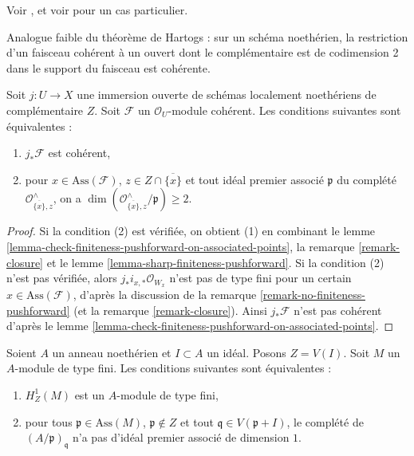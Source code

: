 \begin{proposition}[Koll\'ar]
\label{proposition-kollar}
\begin{reference}
Voir \cite{k-coherent}, et voir \cite[IV, Proposition 7.2.2]{EGA} pour un cas particulier.
\end{reference}
\begin{slogan}
Analogue faible du théorème de Hartogs : sur un schéma noethérien, la restriction d'un faisceau cohérent à un ouvert dont le complémentaire est de codimension 2 dans le support du faisceau est cohérente.
\end{slogan}
Soit $j : U \to X$ une immersion ouverte de schémas localement noethériens de complémentaire $Z$. Soit $\mathcal{F}$ un $\mathcal{O}_U$-module cohérent. Les conditions suivantes sont équivalentes :
\begin{enumerate}
\item $j_*\mathcal{F}$ est cohérent,
\item pour $x \in \text{Ass}(\mathcal{F})$, $z \in Z \cap \overline{\{x\}}$ et tout idéal premier associé $\mathfrak p$ du complété $\mathcal{O}_{\overline{\{x\}}, z}^\wedge$, on a $\dim(\mathcal{O}_{\overline{\{x\}}, z}^\wedge/\mathfrak p) \geq 2$.
\end{enumerate}
\end{proposition}

\begin{proof}
Si la condition (2) est vérifiée, on obtient (1) en combinant le lemme \ref{lemma-check-finiteness-pushforward-on-associated-points}, la remarque \ref{remark-closure} et le lemme \ref{lemma-sharp-finiteness-pushforward}. Si la condition (2) n'est pas vérifiée, alors $j_*i_{x, *}\mathcal{O}_{W_x}$ n'est pas de type fini pour un certain $x \in \text{Ass}(\mathcal{F})$, d'après la discussion de la remarque \ref{remark-no-finiteness-pushforward} (et la remarque \ref{remark-closure}). Ainsi $j_*\mathcal{F}$ n'est pas cohérent d'après le lemme \ref{lemma-check-finiteness-pushforward-on-associated-points}.
\end{proof}

\begin{lemma}
\label{lemma-kollar-finiteness-H1-local}
Soient $A$ un anneau noethérien et $I \subset A$ un idéal. Posons $Z = V(I)$. Soit $M$ un $A$-module de type fini. Les conditions suivantes sont équivalentes :
\begin{enumerate}
\item $H^1_Z(M)$ est un $A$-module de type fini,
\item pour tous $\mathfrak p \in \text{Ass}(M)$, $\mathfrak p \not \in Z$ et tout $\mathfrak q \in V(\mathfrak p + I)$, le complété de $(A/\mathfrak p)_\mathfrak q$ n'a pas d'idéal premier associé de dimension $1$.
\end{enumerate}
\end{lemma}

